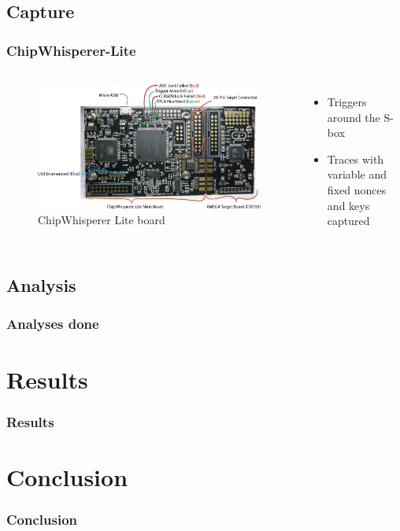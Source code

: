 \documentclass{beamer}
\begin{document}
	\subsection{Capture}
	\begin{frame}
		\frametitle{ChipWhisperer-Lite}
		\begin{columns}
			\begin{figure}[h]
				\includegraphics[width=\textwidth]{cwlite_basic1}
				\caption{ChipWhisperer Lite board}
				\label{fig:cw}
			\end{figure}
			
			\begin{itemize}
				\item Triggers around the S-box
				\item Traces with variable and fixed nonces  and keys captured
			\end{itemize}
		\end{columns}
	\end{frame}
	
	\subsection{Analysis}
	\begin{frame}
		\frametitle{Analyses done}
	\end{frame}
	
	
	\section{Results}
	\begin{frame}
		\frametitle{Results}
	\end{frame}
	
	
	\section{Conclusion}
	\begin{frame}
		\frametitle{Conclusion}
	\end{frame}
\end{document}
